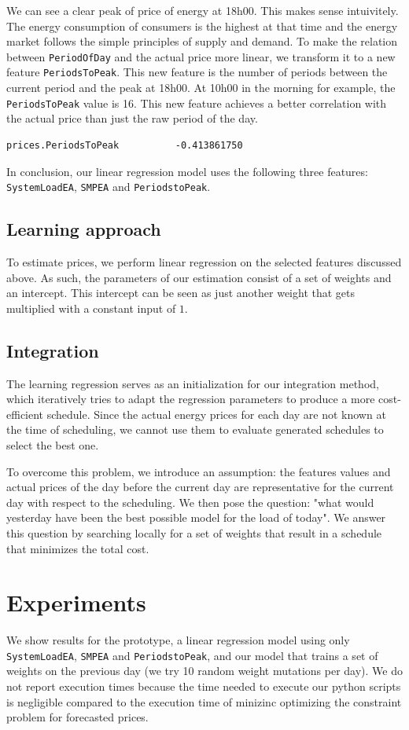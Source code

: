 \documentclass{article}
\begin{document}
We can see a clear peak of price of energy at 18h00. This makes sense intuivitely. The energy consumption of consumers is the highest at that time and the energy market follows the simple principles of supply and demand. To make the relation between \verb|PeriodOfDay| and the actual price more linear, we transform it to a new feature \verb|PeriodsToPeak|. This new feature is the number of periods between the current period and the peak at 18h00. At 10h00 in the morning for example, the \verb|PeriodsToPeak| value is 16. This new feature achieves a better correlation with the actual price than just the raw period of the day.
\begin{verbatim}
prices.PeriodsToPeak          -0.413861750
\end{verbatim}
In conclusion, our linear regression model uses the following three features: \verb|SystemLoadEA|, \verb|SMPEA| and \verb|PeriodstoPeak|.

\subsection{Learning approach}
To estimate prices, we perform linear regression on the selected features discussed above. As such, the parameters of our estimation consist of a set of weights and an intercept. This intercept can be seen as just another weight that gets multiplied with a constant input of $1$. 

\subsection{Integration}
The learning regression serves as an initialization for our integration method, which iteratively tries to adapt the regression parameters to produce a more cost-efficient schedule. Since the actual energy prices for each day are not known at the time of scheduling, we cannot use them to evaluate generated schedules to select the best one.

To overcome this problem, we introduce an assumption: the features values and actual prices of the day before the current day are representative for the current day with respect to the scheduling. We then pose the question: "what would yesterday have been the best possible model for the load of today". We answer this question by searching locally for a set of weights that result in a schedule that minimizes the total cost.

\section{Experiments}
We show results for the prototype, a linear regression model using only \verb|SystemLoadEA|, \verb|SMPEA| and \verb|PeriodstoPeak|, and our model that trains a set of weights on the previous day (we try 10 random weight mutations per day). We do not report execution times because the time needed to execute our python scripts is negligible compared to the execution time of minizinc optimizing the constraint problem for forecasted prices.
\end{document}
